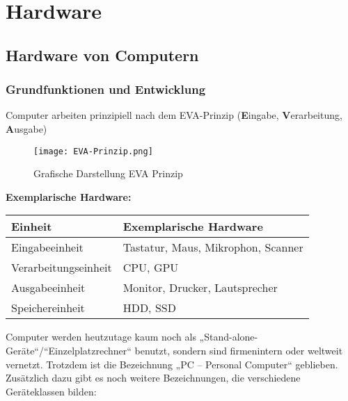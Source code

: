 \documentclass[asp1.tex]{subfiles}
\begin{document}

\section{Hardware}
\subsection{Hardware von Computern}

\subsubsection{Grundfunktionen und Entwicklung}

Computer arbeiten prinzipiell nach dem EVA-Prinzip (\textbf{E}ingabe, \textbf{V}erarbeitung, \textbf{A}usgabe)

\begin{figure}[H]
    \begin{center}
        \texttt{[image: EVA-Prinzip.png]}
    \end{center}
    \caption{Grafische Darstellung EVA Prinzip}
\end{figure}

\textbf{Exemplarische Hardware:}

\begin{table}[H]
    \centering
    \begin{tabular}{l|l}
        Einheit              & Exemplarische Hardware             \\\hline
        Eingabeeinheit       & Tastatur, Maus, Mikrophon, Scanner \\
        Verarbeitungseinheit & CPU, GPU                           \\
        Ausgabeeinheit       & Monitor, Drucker, Lautsprecher     \\
        Speichereinheit      & HDD, SSD
    \end{tabular}
\end{table}

Computer werden heutzutage kaum noch als „Stand-alone-Geräte“/“Einzelplatzrechner“ benutzt, sondern sind firmenintern oder weltweit vernetzt. Trotzdem ist die Bezeichnung „PC – Personal Computer“ geblieben. Zusätzlich dazu gibt es noch weitere Bezeichnungen, die verschiedene Geräteklassen bilden:
\end{document}
